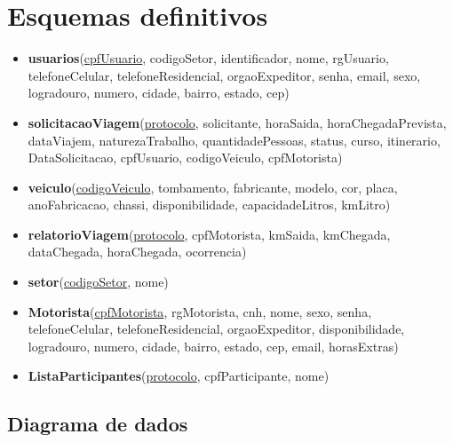 \documentclass[11pt]{article}
\begin{document}
\section{Esquemas definitivos}
\begin{itemize}

\item \textbf{usuarios}(\underline{cpfUsuario}, codigoSetor, identificador, nome, rgUsuario, telefoneCelular, telefoneResidencial, orgaoExpeditor, senha,
email, sexo, logradouro, numero, cidade, bairro, estado, cep)

\item \textbf{solicitacaoViagem}(\underline{protocolo}, solicitante, horaSaida, horaChegadaPrevista, dataViajem, naturezaTrabalho, quantidadePessoas, status, curso, itinerario, DataSolicitacao, cpfUsuario,  codigoVeiculo, cpfMotorista)

\item \textbf{veiculo}(\underline{codigoVeiculo}, tombamento, fabricante, modelo, cor, placa, anoFabricacao, chassi, disponibilidade, capacidadeLitros, kmLitro)

\item \textbf{relatorioViagem}(\underline{protocolo}, cpfMotorista, kmSaida, kmChegada, dataChegada, horaChegada, ocorrencia)

\item \textbf{setor}(\underline{codigoSetor}, nome)

\item \textbf{Motorista}(\underline{cpfMotorista}, rgMotorista, cnh, nome, sexo, senha, telefoneCelular, telefoneResidencial, orgaoExpeditor, disponibilidade, logradouro, numero, cidade, bairro, estado, cep, email, horasExtras)

\item \textbf{ListaParticipantes}(\underline{protocolo}, cpfParticipante, nome)

\end{itemize}

\subsection{Diagrama de dados}
\end{document}
